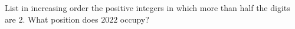 List in increasing order the positive integers in which more than half the digits are $ 2 $. What position does $ 2022 $ occupy?
